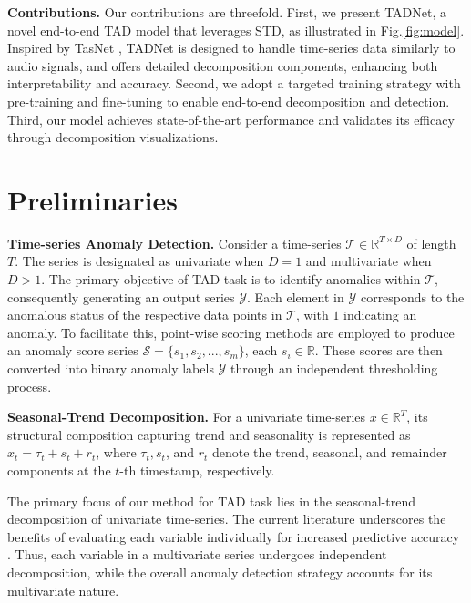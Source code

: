\documentclass{article}
\begin{document}
\textbf{Contributions.} Our contributions are threefold. First, we present TADNet, a novel end-to-end TAD model that leverages STD, as illustrated in Fig.\ref{fig:model}. Inspired by TasNet \cite{luo2018tasnet}, TADNet is designed to handle time-series data similarly to audio signals, and offers detailed decomposition components, enhancing both interpretability and accuracy. Second, we adopt a targeted training strategy with pre-training and fine-tuning to enable end-to-end decomposition and detection. Third, our model achieves state-of-the-art performance and validates its efficacy through decomposition visualizations.

\section{Preliminaries}

\textbf{Time-series Anomaly Detection.} Consider a time-series \(\mathcal{T} \in \mathbb{R}^{T \times D}\) of length \(T\). The series is designated as univariate when \(D = 1\) and multivariate when \(D > 1\). The primary objective of TAD task is to identify anomalies within \(\mathcal{T}\), consequently generating an output series \(\mathcal{Y}\). Each element in \(\mathcal{Y}\) corresponds to the anomalous status of the respective data points in \(\mathcal{T}\), with $1$ indicating an anomaly. 
To facilitate this, point-wise scoring methods \cite{tuli2022tranad, schmidl2022anomaly} are employed to produce an anomaly score series \(\mathcal{S} = \{ s_1, s_2, ... , s_m \}\), each \( s_i \in \mathbb{R} \). These scores are then converted into binary anomaly labels \(\mathcal{Y}\) through an independent thresholding process.

\textbf{Seasonal-Trend Decomposition.} For a univariate time-series \(x \in \mathbb{R}^T\), its structural composition capturing trend and seasonality is represented as \(x_t = \tau_t + s_t + r_t\), where \(\tau_t, s_t\), and \(r_t\) denote the trend, seasonal, and remainder components at the \(t\)-th timestamp, respectively. 

The primary focus of our method for TAD task lies in the seasonal-trend decomposition of univariate time-series. The current literature underscores the benefits of evaluating each variable individually for increased predictive accuracy \cite{zhang2023sageformer}. Thus, each variable in a multivariate series undergoes independent decomposition, while the overall anomaly detection strategy accounts for its multivariate nature.
\end{document}

